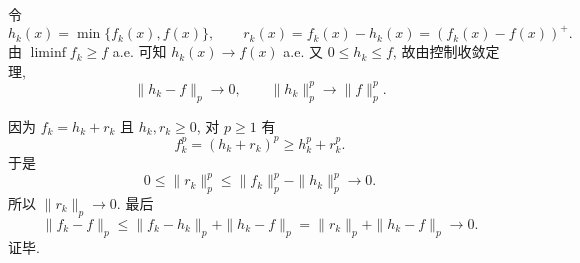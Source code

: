 \documentclass{article}
\begin{document}
\begin{solution}
  令
  \[
    h_k(x)=\min\{f_k(x),f(x)\},\qquad
    r_k(x)=f_k(x)-h_k(x)=(f_k(x)-f(x))^+.
  \]
  由 $\liminf f_k\ge f$ a.e. 可知 $h_k(x)\to f(x)$ a.e.
  又 $0\le h_k\le f$, 故由控制收敛定理,
  \[
    \|h_k-f\|_p\to0,\qquad \|h_k\|_p^p\to\|f\|_p^p.
  \]

  因为 $f_k=h_k+r_k$ 且 $h_k,r_k\ge0$, 对 $p\ge1$ 有
  \[
    f_k^p=(h_k+r_k)^p\ge h_k^p+r_k^p.
  \]
  于是
  \[
    0\le \|r_k\|_p^p
    \le \|f_k\|_p^p-\|h_k\|_p^p\longrightarrow0.
  \]
  所以 $\|r_k\|_p\to0$. 最后
  \[
    \|f_k-f\|_p
    \le \|f_k-h_k\|_p+\|h_k-f\|_p
    =\|r_k\|_p+\|h_k-f\|_p\to0.
  \]
  证毕.
\end{solution}
\end{document}
